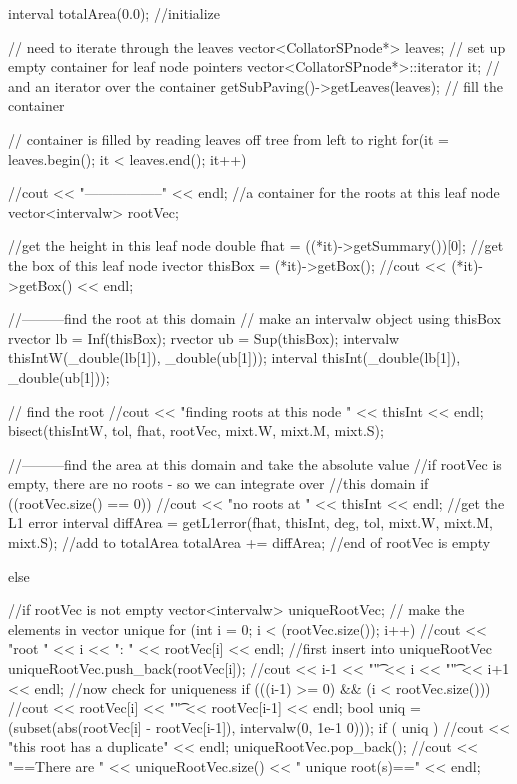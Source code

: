 \begin{DoxyCode}
{
  interval totalArea(0.0); //initialize
  
  // need to iterate through the leaves
  vector<CollatorSPnode*> leaves; // set up empty container for leaf node
       pointers
  vector<CollatorSPnode*>::iterator it; // and an iterator over the container
  getSubPaving()->getLeaves(leaves); // fill the container
  
  // container is filled by reading leaves off tree from left to right
  for(it = leaves.begin(); it < leaves.end(); it++) {
    //cout << "-----------------" << endl;
    //a container for the roots at this leaf node
    vector<intervalw> rootVec;
    
    //get the height in this leaf node
    double fhat = ((*it)->getSummary())[0];
    //get the box of this leaf node
    ivector thisBox = (*it)->getBox();
    //cout << (*it)->getBox() << endl;
    
    //---------find the root at this domain
    // make an intervalw object using thisBox
    rvector lb = Inf(thisBox);
    rvector ub = Sup(thisBox);
    intervalw thisIntW(_double(lb[1]), _double(ub[1]));
    interval thisInt(_double(lb[1]), _double(ub[1]));
    
    // find the root
    //cout << "finding roots at this node " << thisInt << endl;
    bisect(thisIntW, tol, fhat, rootVec, mixt.W, mixt.M, mixt.S); 

    //---------find the area at this domain and take the absolute value
    //if rootVec is empty, there are no roots - so we can integrate over
    //this domain
    if ((rootVec.size() == 0)) { 
      //cout << "no roots at " << thisInt << endl;
      //get the L1 error
      interval diffArea = getL1error(fhat, thisInt, deg, tol, mixt.W, mixt.M, 
      mixt.S);
      //add to totalArea
      totalArea += diffArea;
    } //end of rootVec is empty

    else { //if rootVec is not empty
      vector<intervalw> uniqueRootVec;
      // make the elements in vector unique
      for (int i = 0; i < (rootVec.size()); i++) {
        //cout << "root " << i << ": " << rootVec[i] << endl;
        //first insert into uniqueRootVec
        uniqueRootVec.push_back(rootVec[i]);
        //cout << i-1 << "\t" << i << "\t" << i+1 << endl;
        //now check for uniqueness
        if (((i-1) >= 0) && (i < rootVec.size())) {
          //cout << rootVec[i] << "\t" << rootVec[i-1] << endl;
          bool uniq = (subset(abs(rootVec[i] - rootVec[i-1]), intervalw(0, 1e-1
      0)));
          if ( uniq ) { 
            //cout << "this root has a duplicate" << endl;
            uniqueRootVec.pop_back(); }
        }
      }
      //cout << "==There are " << uniqueRootVec.size() << " unique root(s)=="
       << endl;

}}}
\end{DoxyCode}
